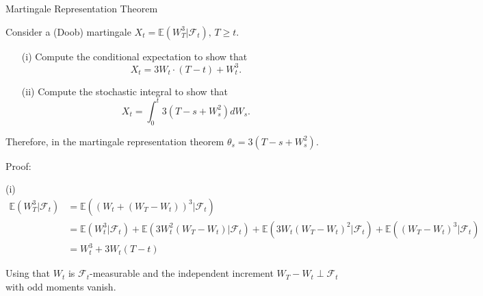 \documentclass{beamer}
\begin{document}
\begin{frame}{Martingale Representation Theorem}

    {\footnotesize \footnotesize
    \par Consider a (Doob) martingale $X_t = \mathbb{E}(W_T^3 | \mathcal{F}_t), \, T \geq t$.
    \begin{itemize}
    \item[(i)] Compute the conditional expectation to show that  
    \[
    X_t = 3W_t \cdot (T - t) + W_t^3.
    \]
    
    \item[(ii)] Compute the stochastic integral to show that  
    \[
    X_t = \int_0^t 3(T - s + W_s^2) dW_s.
    \]
    \end{itemize}

    \par Therefore, in the martingale representation theorem $\theta_s = 3(T - s + W_s^2)$.
    \par Proof:
    \par (i)
    {\footnotesize \tiny
    \begin{align*}
         \mathbb{E}(W_T^3 | \mathcal{F}_t) & = \mathbb{E}((W_t + (W_T-W_t))^3 | \mathcal{F}_t)\\
         & = \mathbb{E}(W_t ^3 | \mathcal{F}_t) + \mathbb{E}(3W_t^2(W_T-W_t) | \mathcal{F}_t)
         + \mathbb{E}(3W_t(W_T-W_t)^2 | \mathcal{F}_t) + \mathbb{E}((W_T-W_t) ^3 | \mathcal{F}_t)\\
         &= W_t^3 + 3W_t (T - t)
    \end{align*}
    }
    \par Using that $W_t$ is $\mathcal{F}_t$-measurable and the independent increment $W_T - W_t \perp \mathcal{F}_t$ 
    with odd moments vanish.
    }

\end{frame} 
\end{document}
